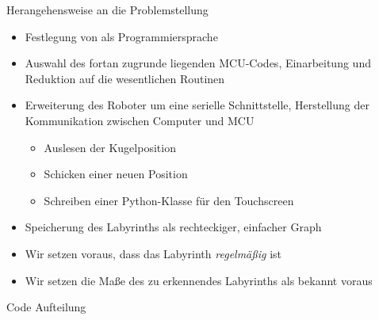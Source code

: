 \documentclass{beamer}
\begin{document}
\begin{frame}[fragile,t]{Herangehensweise an die Problemstellung}
\begin{itemize}
\item Festlegung von  als Programmiersprache
\item Auswahl des fortan zugrunde liegenden MCU-Codes, Einarbeitung und Reduktion auf die wesentlichen Routinen
\item Erweiterung des Roboter um eine serielle Schnittstelle, Herstellung der Kommunikation zwischen Computer und MCU
\begin{itemize}
\item Auslesen der Kugelposition
\item Schicken einer neuen Position
\item Schreiben einer Python-Klasse für den Touchscreen
\end{itemize}
\item Speicherung des Labyrinths als rechteckiger, einfacher Graph
\item Wir setzen voraus, dass das Labyrinth \textit{regelmäßig} ist
\item Wir setzen die Maße des zu erkennendes Labyrinths als bekannt voraus
\end{itemize}
\end{frame}

\begin{frame}[fragile,t]{Code Aufteilung}
\vfill
\begin{figure}[h]
  \centering
\end{figure}
\end{frame}
\end{document}

